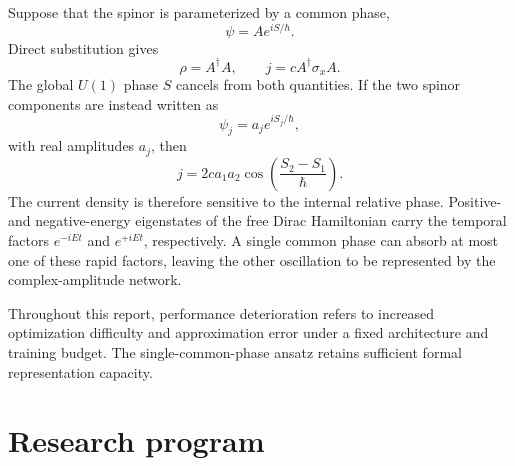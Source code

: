 \documentclass[a4paper,11pt]{article}
\begin{document}
Suppose that the spinor is parameterized by a common phase,
\begin{equation}
\psi=Ae^{iS/\hbar}.
\end{equation}
Direct substitution gives
\begin{equation}
\rho=A^\dagger A,
\qquad
j=cA^\dagger\sigma_xA.
\end{equation}
The global \(U(1)\) phase \(S\) cancels from both quantities. If the two spinor
components are instead written as
\begin{equation}
\psi_j=a_je^{iS_j/\hbar},
\end{equation}
with real amplitudes \(a_j\), then
\begin{equation}
j=2ca_1a_2\cos\!\left(\frac{S_2-S_1}{\hbar}\right).
\end{equation}
The current density is therefore sensitive to the internal relative phase.
Positive- and negative-energy eigenstates of the free Dirac Hamiltonian carry
the temporal factors \(e^{-iEt}\) and \(e^{+iEt}\), respectively. A single
common phase can absorb at most one of these rapid factors, leaving the other
oscillation to be represented by the complex-amplitude network.

Throughout this report, performance deterioration refers to increased
optimization difficulty and approximation error under a fixed architecture and
training budget. The single-common-phase ansatz retains sufficient formal
representation capacity.

\section{Research program}
\end{document}
